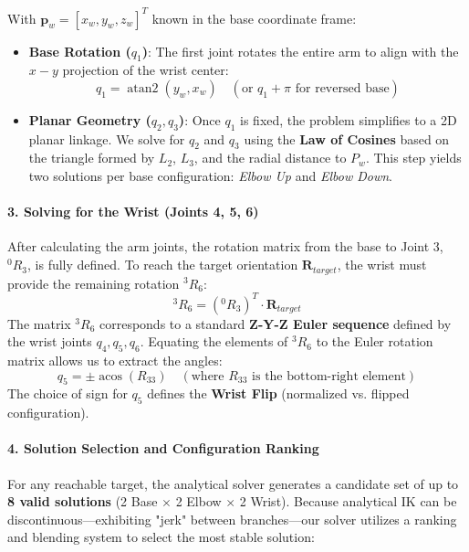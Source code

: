 \documentclass[12pt,a4paper]{report}
\begin{document}
With $\mathbf{p}_w = [x_w, y_w, z_w]^T$ known in the base coordinate frame:
\begin{itemize}
    \item \textbf{Base Rotation ($q_1$)}: The first joint rotates the entire arm to align with the $x-y$ projection of the wrist center:
    \begin{equation}
        q_1 = \operatorname{atan2}(y_w, x_w) \quad (\text{or } q_1 + \pi \text{ for reversed base})
    \end{equation}
    \item \textbf{Planar Geometry ($q_2, q_3$)}: Once $q_1$ is fixed, the problem simplifies to a 2D planar linkage. We solve for $q_2$ and $q_3$ using the \textbf{Law of Cosines} based on the triangle formed by $L_2$, $L_3$, and the radial distance to $P_w$. This step yields two solutions per base configuration: \textit{Elbow Up} and \textit{Elbow Down}.
\end{itemize}

\paragraph{3. Solving for the Wrist (Joints 4, 5, 6)}

After calculating the arm joints, the rotation matrix from the base to Joint 3, ${}^{0}R_3$, is fully defined. To reach the target orientation $\mathbf{R}_{target}$, the wrist must provide the remaining rotation ${}^{3}R_6$:
\begin{equation}
    {}^{3}R_6 = ({}^{0}R_3)^T \cdot \mathbf{R}_{target}
\end{equation}
The matrix ${}^{3}R_6$ corresponds to a standard \textbf{Z-Y-Z Euler sequence} defined by the wrist joints $q_4, q_5, q_6$. Equating the elements of ${}^{3}R_6$ to the Euler rotation matrix allows us to extract the angles:
\begin{equation}
    q_5 = \pm \operatorname{acos}(R_{33}) \quad (\text{where } R_{33} \text{ is the bottom-right element})
\end{equation}
The choice of sign for $q_5$ defines the \textbf{Wrist Flip} (normalized vs. flipped configuration).

\paragraph{4. Solution Selection and Configuration Ranking}

For any reachable target, the analytical solver \cite{EAIK} generates a candidate set of up to \textbf{8 valid solutions} (2 Base $\times$ 2 Elbow $\times$ 2 Wrist). Because analytical IK can be discontinuous—exhibiting "jerk" between branches—our solver utilizes a ranking and blending system to select the most stable solution:
\end{document}
